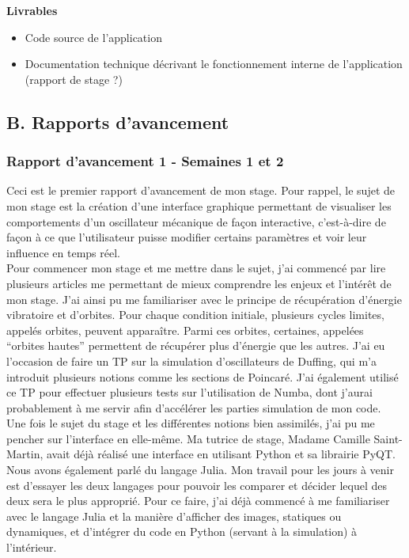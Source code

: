 \documentclass[a4paper, french, 12pt, titlepage]{article}
\begin{document}
\textbf{Livrables}
\begin{itemize}

  \item Code source de l'application
  \item Documentation technique décrivant le fonctionnement interne de l'application (rapport de stage ?)
\end{itemize}


\newpage



\subsection*{B. Rapports d'avancement}

\subsubsection*{Rapport d'avancement 1 - Semaines 1 et 2}

Ceci est le premier rapport d'avancement de mon stage. Pour rappel, le sujet de mon stage est la création d'une interface graphique permettant de visualiser les comportements d'un oscillateur mécanique de façon interactive, c'est-à-dire de façon à ce que l'utilisateur puisse modifier certains paramètres et voir leur influence en temps réel. \\

Pour commencer mon stage et me mettre dans le sujet, j'ai commencé par lire plusieurs articles me permettant de mieux comprendre les enjeux et l'intérêt de mon stage. J'ai ainsi pu me familiariser avec le principe de récupération d'énergie vibratoire et d'orbites. Pour chaque condition initiale, plusieurs cycles limites, appelés orbites, peuvent apparaître. Parmi ces orbites, certaines, appelées “orbites hautes” permettent de récupérer plus d'énergie que les autres. J'ai eu l'occasion de faire un TP sur la simulation d'oscillateurs de Duffing, qui m'a introduit plusieurs notions comme les sections de Poincaré. J'ai également utilisé ce TP pour effectuer plusieurs tests sur l'utilisation de Numba, dont j'aurai probablement à me servir afin d'accélérer les parties simulation de mon code.\\

Une fois le sujet du stage et les différentes notions bien assimilés, j'ai pu me pencher sur l'interface en elle-même. Ma tutrice de stage, Madame Camille Saint-Martin, avait déjà réalisé une interface en utilisant Python et sa librairie PyQT. Nous avons également parlé du langage Julia. Mon travail pour les jours à venir est d'essayer les deux langages pour pouvoir les comparer et décider lequel des deux sera le plus approprié. Pour ce faire, j'ai déjà commencé à me familiariser avec le langage Julia et la manière d'afficher des images, statiques ou dynamiques, et d'intégrer du code en Python (servant à la simulation) à l'intérieur.  \\
\end{document}
